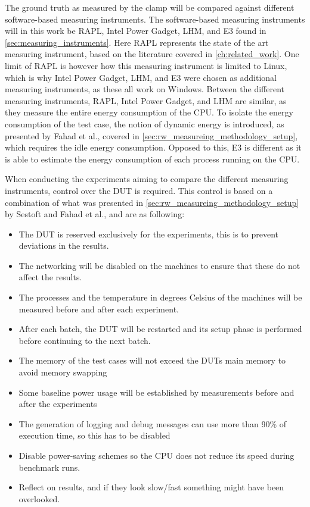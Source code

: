 The ground truth as measured by the clamp will be compared against different software-based measuring instruments. The software-based measuring instruments will in this work be RAPL, Intel Power Gadget, LHM, and E3 found in \cref{sec:measuring_instruments}. Here RAPL represents the state of the art measuring instrument, based on the literature covered in \cref{ch:related_work}. One limit of RAPL is however how this measuring instrument is limited to Linux, which is why Intel Power Gadget, LHM, and E3 were chosen as additional measuring instruments, as these all work on Windows. Between the different measuring instruments, RAPL, Intel Power Gadget, and LHM are similar, as they measure the entire energy consumption of the CPU. To isolate the energy consumption of the test case, the notion of dynamic energy is introduced, as presented by Fahad et al.\cite{fahad2019comparative}, covered in \cref{sec:rw_measureing_methodology_setup}, which requires the idle energy consumption. Opposed to this, E3 is different as it is able to estimate the energy consumption of each process running on the CPU.\newline

When conducting the experiments aiming to compare the different measuring instruments, control over the DUT is required. This control is based on a combination of what was presented in \cref{sec:rw_measureing_methodology_setup} by Sestoft\cite[]{sestoft2013microbenchmarks} and Fahad et al.\cite[]{fahad2019comparative}, and are as following:

\begin{itemize}
    \item The DUT is reserved exclusively for the experiments, this is to prevent deviations in the results.
    \item The networking will be disabled on the machines to ensure that these do not affect the results.
    \item The processes and the temperature in degrees Celsius of the machines will be measured before and after each experiment.
    \item After each batch, the DUT will be restarted and its setup phase is performed before continuing to the next batch.
    \item The memory of the test cases will not exceed the DUTs main memory to avoid memory swapping
    \item Some baseline power usage will be established by measurements before and after the experiments
    \item The generation of logging and debug messages can use more than 90\% of execution time, so this has to be disabled
    \item Disable power-saving schemes so the CPU does not reduce its speed during benchmark runs.
    \item Reflect on results, and if they look slow/fast something might have been overlooked.
\end{itemize}


